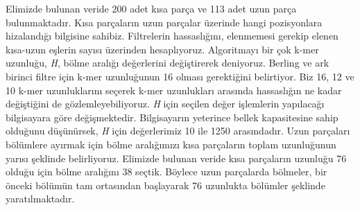 Elimizde bulunan veride 200 adet kısa parça ve 113 adet uzun parça bulunmaktadır. Kısa parçaların uzun parçalar üzerinde hangi pozisyonlara hizalandığı bilgisine sahibiz. Filtrelerin hassaslığını, elenmemesi gerekip elenen kısa-uzun eşlerin sayısı üzerinden hesaplıyoruz. Algoritmayı bir çok k-mer uzunluğu, \textit{H}, bölme aralığı değerlerini değiştirerek deniyoruz. Berling ve ark \cite{Berlin2015} birinci filtre için k-mer uzunluğunun 16 olması gerektiğini belirtiyor. Biz 16, 12 ve 10 k-mer uzunluklarını seçerek k-mer uzunlukları arasında hassaslığın ne kadar değiştiğini de gözlemleyebiliyoruz. \textit{H} için seçilen değer işlemlerin yapılacağı bilgisayara göre değişmektedir. Bilgisayarın yeterince bellek kapasitesine sahip olduğunu düşünürsek, \textit{H} için değerlerimiz 10 ile 1250 arasındadır. Uzun parçaları bölümlere ayırmak için bölme aralığımızı kısa parçaların toplam uzunluğunun yarısı şeklinde belirliyoruz. Elimizde bulunan veride kısa parçaların uzunluğu 76 olduğu için bölme aralığını 38 seçtik. Böylece uzun parçalarda bölmeler, bir önceki bölümün tam ortasından başlayarak 76 uzunlukta bölümler şeklinde yaratılmaktadır.

